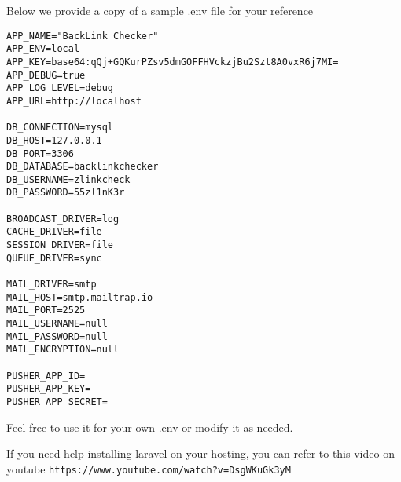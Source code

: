 Below we provide a copy of a sample .env file for your reference
\begin{verbatim}
APP_NAME="BackLink Checker"
APP_ENV=local
APP_KEY=base64:qQj+GQKurPZsv5dmGOFFHVckzjBu2Szt8A0vxR6j7MI=
APP_DEBUG=true
APP_LOG_LEVEL=debug
APP_URL=http://localhost

DB_CONNECTION=mysql
DB_HOST=127.0.0.1
DB_PORT=3306
DB_DATABASE=backlinkchecker
DB_USERNAME=zlinkcheck
DB_PASSWORD=55zl1nK3r

BROADCAST_DRIVER=log
CACHE_DRIVER=file
SESSION_DRIVER=file
QUEUE_DRIVER=sync

MAIL_DRIVER=smtp
MAIL_HOST=smtp.mailtrap.io
MAIL_PORT=2525
MAIL_USERNAME=null
MAIL_PASSWORD=null
MAIL_ENCRYPTION=null

PUSHER_APP_ID=
PUSHER_APP_KEY=
PUSHER_APP_SECRET=
\end{verbatim}

Feel free to use it for your own .env or modify it as needed.

If you need help installing laravel on your hosting, you can refer to this video on youtube \verb|https://www.youtube.com/watch?v=DsgWKuGk3yM|